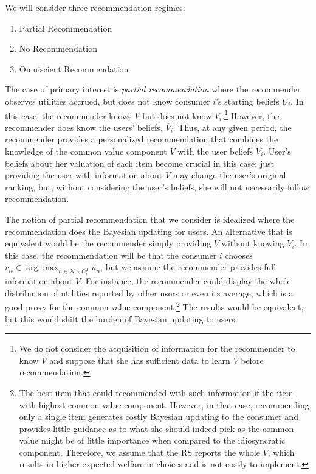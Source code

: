 \documentclass[sigconf]{acmart}
\begin{document}
We will consider three recommendation regimes:
\begin{enumerate}
\item Partial Recommendation
\item No Recommendation
\item Omniscient Recommendation
\end{enumerate}
The case of primary interest is \textit{partial recommendation} where the recommender observes utilities accrued, but does not know consumer $i$'s starting beliefs $\overline U_i$. In this case, the recommender knows $V$ but does not know $V_i$.\footnote{We do not consider the acquisition of information for the recommender to know $V$ and suppose that she has sufficient data to learn $V$ before recommendation.} However, the recommender does know the users' beliefs, $\overline V_i$. Thus, at any given period, the recommender provides a personalized recommendation that combines the knowledge of the common value component $V$ with the user beliefs $\overline V_i$. User's beliefs about her valuation of each item become crucial in this case: just providing the user with information about $V$ may change the user's original ranking, but, without considering the user's beliefs, she will not necessarily follow recommendation.

The notion of partial recommendation that we consider is idealized where the recommendation does the Bayesian updating for users. An alternative that is equivalent would be the recommender simply providing $V$ without knowing $\overline V_i$. In this case, the recommendation will be that the consumer $i$ chooses $r_{it} \in \arg \max_{n \in \mathcal{N} \backslash C_i^T} u_n$, but we assume the recommender provides full information about $V$. For instance, the recommender could display the whole distribution of utilities reported by other users or even its average, which is a good proxy for the common value component.\footnote{
The best item that could recommended with such information if the item with highest common value component. However, in that case, recommending only a single item generates costly Bayesian updating to the consumer and provides little guidance as to what she should indeed pick as the common value might be of little importance when compared to the idiosyncratic component. Therefore, we assume that the RS reports the whole $V$, which results in higher expected welfare in choices and is not costly to implement.
} The results would be equivalent, but this would shift the burden of Bayesian updating to users.
\end{document}
